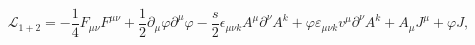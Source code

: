 \begin{equation}
\mathcal{L}_{1+2}=-\frac{1}{4}F_{\mu\nu}F^{\mu\nu}+\frac{1}{2}\partial_{\mu
}\varphi\partial^{\mu}\varphi-\frac{s}{2}\epsilon_{\mu\nu k}A^{\mu}%
\partial^{\nu}A^{k}+\varphi\varepsilon_{\mu\nu k}v^{\mu}\partial^{\nu}%
A^{k}+A_{\mu}J^{\mu}+\varphi J, \label{Reduced}%
\end{equation}

